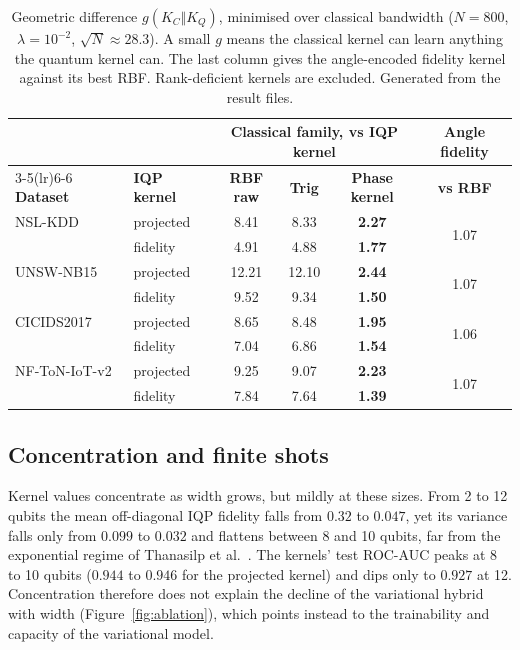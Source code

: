 \documentclass[preprint,11pt]{elsarticle}
\begin{document}
\begin{table}[t]
\centering
\caption{Geometric difference $g(K_C\Vert K_Q)$, minimised over classical bandwidth
($N=800$, $\lambda=10^{-2}$, $\sqrt{N}\approx 28.3$). A small $g$ means the
classical kernel can learn anything the quantum kernel can. The last column gives the angle-encoded
fidelity kernel against its best RBF. Rank-deficient kernels are excluded. Generated from the result
files.}
\label{tab:geom}
\footnotesize
\renewcommand{\arraystretch}{1.15}
\setlength{\tabcolsep}{3pt}
\begin{tabular}{@{}llcccc@{}}
\toprule
& & \multicolumn{3}{c}{\textbf{Classical family, vs IQP kernel}} & \textbf{Angle fidelity}\\
\cmidrule(lr){3-5}\cmidrule(lr){6-6}
\textbf{Dataset} & \textbf{IQP kernel} & \textbf{RBF raw} & \textbf{Trig} & \textbf{Phase kernel} & \textbf{vs RBF}\\
\midrule
NSL-KDD & projected & 8.41 & 8.33 & \textbf{2.27} & \multirow{2}{*}{1.07}\\
 & fidelity & 4.91 & 4.88 & \textbf{1.77} & \\
UNSW-NB15 & projected & 12.21 & 12.10 & \textbf{2.44} & \multirow{2}{*}{1.07}\\
 & fidelity & 9.52 & 9.34 & \textbf{1.50} & \\
CICIDS2017 & projected & 8.65 & 8.48 & \textbf{1.95} & \multirow{2}{*}{1.06}\\
 & fidelity & 7.04 & 6.86 & \textbf{1.54} & \\
NF-ToN-IoT-v2 & projected & 9.25 & 9.07 & \textbf{2.23} & \multirow{2}{*}{1.07}\\
 & fidelity & 7.84 & 7.64 & \textbf{1.39} & \\
\bottomrule
\end{tabular}
\end{table}

\subsection{Concentration and finite shots}\label{sec:kshots}
Kernel values concentrate as width grows, but mildly at these sizes. From 2 to 12 qubits the mean
off-diagonal IQP fidelity falls from $0.32$ to $0.047$, yet its variance falls only from $0.099$ to $0.032$
and flattens between 8 and 10 qubits, far from the exponential regime of Thanasilp
et al.~\cite{thanasilp2024concentration}. The kernels' test ROC-AUC peaks at 8 to 10 qubits ($0.944$ to
$0.946$ for the projected kernel) and dips only to $0.927$ at 12. Concentration therefore does not explain
the decline of the variational hybrid with width (Figure~\ref{fig:ablation}), which points instead to the
trainability and capacity of the variational model.
\end{document}
